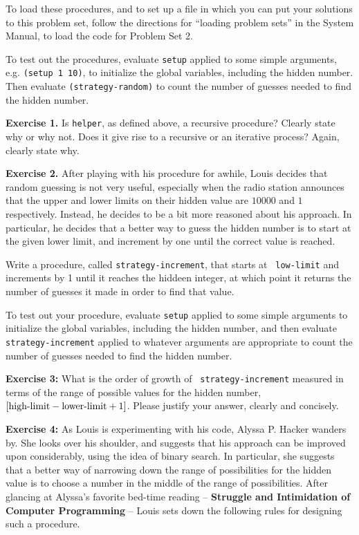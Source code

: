 To load these procedures, and
to set up a file in which you can put your solutions to this problem
set, follow the directions for ``loading problem sets'' in the System
Manual, to load the code for Problem Set 2. 

To test out the procedures, evaluate {\tt setup}  applied to some simple
arguments, e.g. {\tt (setup 1 10)}, to initialize
the global variables, including the hidden number.  Then evaluate
{\tt (strategy-random)} to count the number of guesses needed to find the hidden number.

{\bf Exercise 1.}  Is {\tt helper}, as defined above, a recursive
procedure?  Clearly state why or why not.  Does it give rise to a
recursive or an iterative process?  Again, clearly state why.


{\bf Exercise 2.}
After playing  with his procedure for awhile, Louis decides that random
guessing is not very useful, especially when the radio station announces
that the upper and lower limits on their hidden value are $10000$ and
$1$ respectively.  Instead, he decides to be a bit more reasoned about
his approach.  In particular, he decides that a better way to guess the
hidden number is to start at the given lower limit, and increment by one
until the correct value is reached.

Write a procedure, called {\tt strategy-increment}, 
that starts at {\tt
low-limit} and increments by 1 until it reaches the hiddeen integer, at
which point it returns the number of guesses it made 
in order to find that value.

%

To test out your procedure, evaluate {\tt setup} applied to some simple arguments
to initialize
the global variables, including the hidden number, and then evaluate
{\tt strategy-increment} applied to whatever arguments are appropriate to
count the number of guesses needed to find the hidden number.


{\bf Exercise 3:}  What is the order of growth of {\tt
strategy-increment} measured in terms of the range of possible values
for the hidden number, $[\hbox{\rm high-limit} - \hbox{\rm lower-limit}
+ 1]$.  Please justify your answer, clearly and concisely.

{\bf Exercise 4:}
As Louis is experimenting with his code, Alyssa P. Hacker wanders by.
She looks over his shoulder, and suggests that his approach can be
improved upon considerably, using the idea of binary search.  In
particular, she suggests that a better way of narrowing down the range
of possibilities for the hidden value is to choose a number in the
middle of the range of possibilities.  After glancing at Alyssa's
favorite bed-time reading -- {\bf Struggle and Intimidation of Computer
Programming} --  Louis sets down the following rules for designing such
a procedure.


